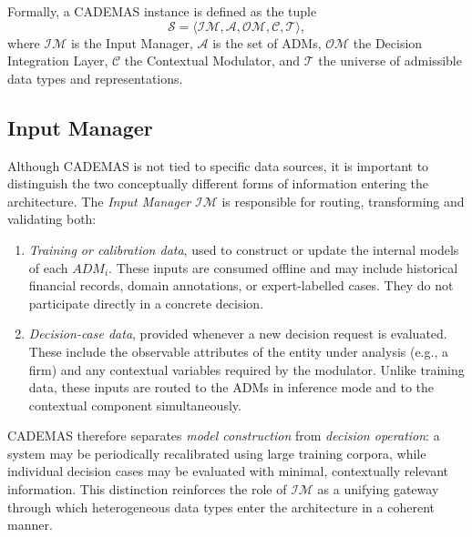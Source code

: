 \documentclass[letterpaper, 10 pt,conference]{IEEEconf}
\begin{document}
Formally, a CADEMAS instance is defined as the tuple
\[
    \mathcal{S} = \langle \mathcal{IM}, \mathcal{A}, \mathcal{OM}, \mathcal{C}, \mathcal{T} \rangle,
\]
where $\mathcal{IM}$ is the Input Manager, $\mathcal{A}$ is the set of ADMs,
$\mathcal{OM}$ the Decision Integration Layer, $\mathcal{C}$ the Contextual
Modulator, and $\mathcal{T}$ the universe of admissible data types and 
representations. 



\subsection{Input Manager}

Although CADEMAS is not tied to specific data sources, it is important to 
distinguish the two conceptually different forms of information entering the 
architecture. The \emph{Input Manager} $\mathcal{IM}$ is responsible for 
routing, transforming and validating both:

\begin{enumerate}
    \item \textit{Training or calibration data}, used to construct or update the 
    internal models of each $ADM_i$. These inputs are consumed offline and may 
    include historical financial records, domain annotations, or expert-labelled 
    cases. They do not participate directly in a concrete decision.

    \item \textit{Decision-case data}, provided whenever a new decision request 
    is evaluated. These include the observable attributes of the entity under 
    analysis (e.g., a firm) and any contextual variables required by the 
    modulator. Unlike training data, these inputs are routed to the ADMs in 
    inference mode and to the contextual component simultaneously.
\end{enumerate}

CADEMAS therefore separates \emph{model construction} from 
\emph{decision operation}: a system may be periodically recalibrated using 
large training corpora, while individual decision cases may be evaluated with 
minimal, contextually relevant information. This distinction reinforces the 
role of $\mathcal{IM}$ as a unifying gateway through which heterogeneous data 
types enter the architecture in a coherent manner.
\end{document}
